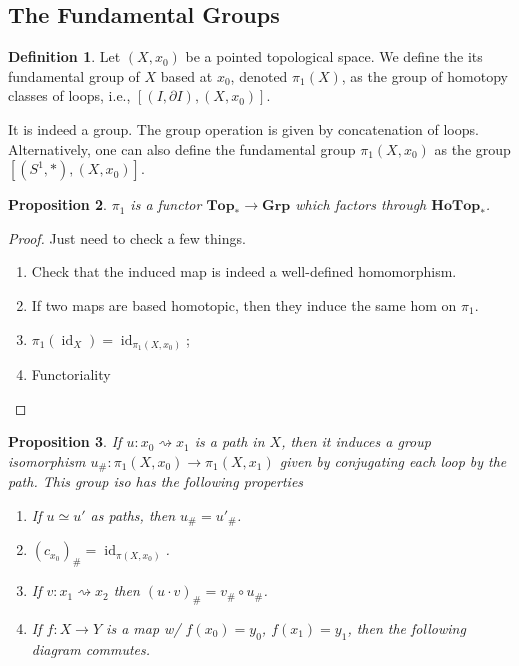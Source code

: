 \documentclass{article}
\theoremstyle{definition}
\newtheorem{defn}{Definition}[section]
\theoremstyle{remark}
\theoremstyle{plain}
\newtheorem{prop}[defn]{Proposition}
\newcommand{\id}{\operatorname{id}}
\begin{document}
\subsection{The Fundamental Groups}
\begin{defn}
    Let $(X,x_0)$ be a pointed topological space. We define the its fundamental group of $X$ based at $x_0$, denoted $\pi_1(X)$, as the group of homotopy classes of loops, i.e., $[(I,\partial I),(X,x_0)]$.
\end{defn}
It is indeed a group. The group operation is given by concatenation of loops. Alternatively, one can also define the fundamental group $\pi_1(X,x_0)$ as the group $[(S^1,\ast),(X,x_0)]$.
\begin{prop}
    $\pi_1$ is a functor $\mathbf{Top}_\ast\to\mathbf{Grp}$ which factors through $\mathbf{HoTop}_\ast$.
\end{prop}
\begin{proof}
    Just need to check a few things.\begin{enumerate}
        \item Check that the induced map is indeed a well-defined homomorphism.
        \item If two maps are based homotopic, then they induce the same hom on $\pi_1$.
        \item $\pi_1(\id_X)=\id_{\pi_1(X,x_0)}$;
        \item Functoriality
    \end{enumerate}
\end{proof}
\begin{prop}
    If $u:x_0\rightsquigarrow x_1$ is a path in $X$, then it induces a group isomorphism $u_\#:\pi_1(X,x_0)\to\pi_1(X,x_1)$ given by conjugating each loop by the path. This group iso has the following properties
    \begin{enumerate}
        \item If $u\simeq u'$ as paths, then $u_\#=u'_\#$.
        \item $(c_{x_0})_\#=\id_{\pi(X,x_0)}$.
        \item If $v:x_1\rightsquigarrow x_2$ then $(u\cdot v)_\#=v_\#\circ u_\#$.
        \item If $f:X\to Y$ is a map w/ $f(x_0)=y_0$, $f(x_1)=y_1$, then the following diagram commutes.
        \begin{center}
        \end{center}
    \end{enumerate}
\end{prop}
\end{document}
